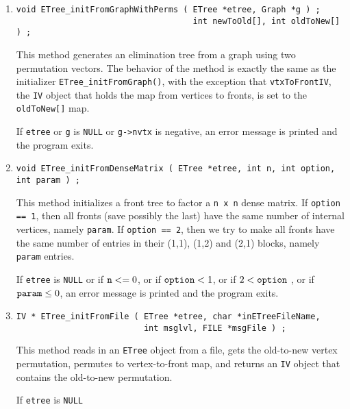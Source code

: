 \begin{enumerate}
\item
\begin{verbatim}
void ETree_initFromGraphWithPerms ( ETree *etree, Graph *g ) ;
                                    int newToOld[], int oldToNew[] ) ;
\end{verbatim}
This method generates an elimination tree from a graph using two
permutation vectors.
The behavior of the method is exactly the same as the initializer
{\tt ETree\_initFromGraph()}, with the exception that 
{\tt vtxToFrontIV}, the {\tt IV} object that holds the map from 
vertices to fronts, is set to the {\tt oldToNew[]} map.
\par {}
If {\tt etree} or {\tt g} is {\tt NULL} or {\tt g->nvtx} is negative, 
an error message is printed and the program exits.
\item
\begin{verbatim}
void ETree_initFromDenseMatrix ( ETree *etree, int n, int option, int param ) ;
\end{verbatim}
This method initializes a front tree to factor 
a {\tt n x n} dense matrix.
If {\tt option == 1}, then all fronts (save possibly the last) have
the same number of internal vertices, namely {\tt param}.
If {\tt option == 2}, then we try to make all fronts have the same
number of entries in their (1,1), (1,2) and (2,1) blocks, namely
{\tt param} entries.
\par {}
If {\tt etree} is {\tt NULL} or if ${\tt n} <= 0$,
or if ${\tt option} < 1$,
or if $2 < {\tt option}$ ,
or if ${\tt param} \le 0$,
an error message is printed and the program exits.
\item
\begin{verbatim}
IV * ETree_initFromFile ( ETree *etree, char *inETreeFileName,
                          int msglvl, FILE *msgFile ) ;
\end{verbatim}
This method reads in an {\tt ETree} object from a file, gets the
old-to-new vertex permutation, permutes to vertex-to-front map,
and returns an {\tt IV} object that contains the old-to-new
permutation.
\par {}
If {\tt etree} is {\tt NULL} 

\end{enumerate}
